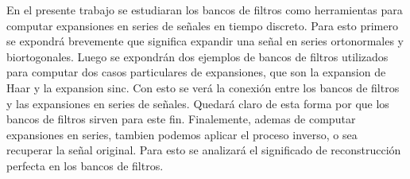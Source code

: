 En el presente trabajo se estudiaran los bancos de filtros como herramientas para computar expansiones en series de señales en tiempo discreto. Para esto primero se expondrá brevemente que significa expandir una señal en series ortonormales y biortogonales. Luego se expondrán dos ejemplos de bancos de filtros utilizados para computar dos casos particulares de expansiones, que son la expansion de Haar y la expansion sinc. Con esto se verá la conexión entre los bancos de filtros y las expansiones en series de señales. Quedará claro de esta forma por que los bancos de filtros sirven para este fin. Finalemente, ademas de computar expansiones en series, tambien podemos aplicar el proceso inverso, o sea recuperar la señal original. Para esto se analizará el significado de reconstrucción perfecta en los bancos de filtros.

